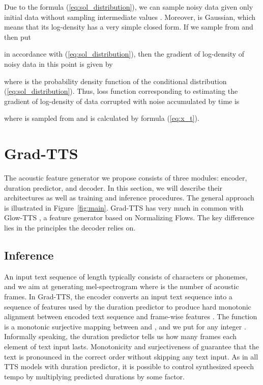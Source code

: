 \documentclass{article}
\begin{document}
\begin{figure*}[ht]
\begin{center}
\end{center}
\caption{Grad-TTS inference scheme.}
\label{fig:main}
\end{figure*}

Due to the formula (\ref{eq:sol_distribution}), we can sample noisy data  given only initial data  without sampling intermediate values . Moreover,  is Gaussian, which means that its log-density has a very simple closed form. If we sample  from  and then put 



in accordance with (\ref{eq:sol_distribution}), then the gradient of log-density of noisy data in this point  is given by



where  is the probability density function of the conditional distribution (\ref{eq:sol_distribution}). Thus, loss function corresponding to estimating the gradient of log-density of data  corrupted with noise accumulated by time  is



where  is sampled from  and  is calculated by formula (\ref{eq:x_t}).

\section{Grad-TTS}
\label{sec:grad-tts}

The acoustic feature generator we propose consists of three modules: encoder, duration predictor, and decoder. In this section, we will describe their architectures as well as training and inference procedures. The general approach is illustrated in Figure~\ref{fig:main}. Grad-TTS has very much in common with Glow-TTS \cite{GlowTTS}, a feature generator based on Normalizing Flows. The key difference lies in the principles the decoder relies on.

\subsection{Inference}
\label{subsec:inference}

An input text sequence  of length  typically consists of characters or phonemes, and we aim at generating mel-spectrogram  where  is the number of acoustic frames. In Grad-TTS, the encoder converts an input text sequence  into a sequence of features  used by the duration predictor to produce hard monotonic alignment  between encoded text sequence  and frame-wise features . The function  is a monotonic surjective mapping between  and , and we put  for any integer . Informally speaking, the duration predictor tells us how many frames each element of text input lasts. Monotonicity and surjectiveness of  guarantee that the text is pronounced in the correct order without skipping any text input. As in all TTS models with duration predictor, it is possible to control synthesized speech tempo by multiplying predicted durations by some factor.
\end{document}
